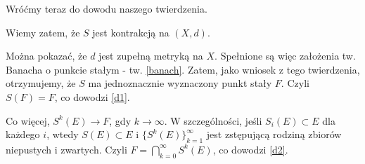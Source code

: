 \documentclass{mini}
\begin{document}
\begin{dow1}
\begin{dow}
\end{dow}

Wróćmy teraz do dowodu naszego twierdzenia.

Wiemy zatem, że $S$ jest kontrakcją na $(X,d)$.

Można pokazać, że $d$ jest zupełną metryką na $X$.
Spełnione są więc założenia tw. Banacha o punkcie stałym - tw. \eqref{banach}.
Zatem, jako wniosek z tego twierdzenia, otrzymujemy, że $S$ ma jednoznacznie wyznaczony punkt stały $F$. Czyli $S(F)=F$, co dowodzi \eqref{d1}.

Co więcej, $S^k(E)\longrightarrow F$, gdy $k\longrightarrow\infty$. W szczególności, jeśli $S_i(E) \subset E$ dla każdego $i$, wtedy $S(E) \subset E$ i $\lbrace S^k(E)\rbrace^{\infty}_{k=1}$ jest zstępującą rodziną zbiorów niepustych i zwartych. Czyli $F = \bigcap^{\infty}_{k=0} S^k(E)$, co dowodzi \eqref{d2}.

\end{dow1}


  
\end{document}
